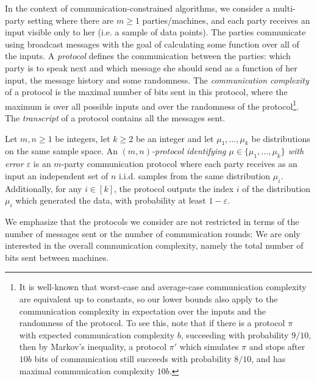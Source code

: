 \documentclass[final, 12pt]{colt2018}
\begin{document}
In the context of communication-constrained algorithms, we consider a multi-party setting where there are $m\ge 1$ parties/machines, and each party  receives an input visible only to her (i.e. a sample of data points). The parties communicate using broadcast messages with the goal of calculating some function over all of the inputs. A \emph{protocol} defines the communication between the parties: which party is to speak next and which message she should send as a function of her input, the message history and some randomness. The \emph{communication complexity} of a protocol is the maximal number of bits sent in this protocol, where the maximum is over all possible inputs and over the randomness of the protocol\footnote{It is well-known that worst-case and average-case communication complexity are equivalent up to constants, so our lower bounds also apply to the communication complexity in expectation over the inputs and the randomness of the protocol. To see this, note that if there is a protocol $\pi$ with expected communication complexity $b$, succeeding with probability $9/10$, then by Markov's inequality, a protocol $\pi'$ which simulates $\pi$ and stops after $10b$ bits of communication still succeeds with probability $8/10$, and has maximal communication complexity $10b$.}. The \emph{transcript} of a protocol contains all the messages sent.

\begin{definition}
Let $m,n \ge 1$ be integers, let $k\ge 2$ be an integer and let $\mu_1, \dots, \mu_k$ be distributions on the same sample space. An \emph{$(m,n)$-protocol identifying $\mu \in \{\mu_1, \dots, \mu_k\}$ with error $\varepsilon$} is an $m$-party communication protocol where each party receives as an input an independent set of $n$ i.i.d. samples from the same distribution $\mu_i$. Additionally, for any $i\in [k]$, the protocol outputs the index $i$ of the distribution $\mu_i$ which generated the data, with probability at least $1-\varepsilon$.
\end{definition}

We emphasize that the protocols we consider are not restricted in terms of the number of messages sent or the number of communication rounds: We are only interested in the overall communication complexity, namely the total number of bits sent between machines.
\end{document}
